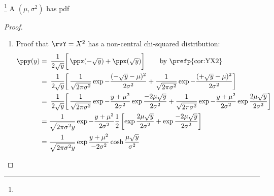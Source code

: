 \begin{definition}
\footnote{
  }
A  $(\mu,\sigma^2)$
has pdf
\end{definition}

\begin{theorem}
\end{theorem}
\begin{proof}
\begin{enumerate}
\item Proof that $\rvY=X^2$ has a non-central chi-squared distribution:
\begin{align*}
  \ppy(y)
    &= \left.\left.\frac{1}{2\sqrt{y}}\right[
       \ppx(-\sqrt{y}) + \ppx( \sqrt{y}) \right]
    \qquad\text{by \prefp{cor:YX2}}
  \\&= \left.\left.\frac{1}{2\sqrt{y}}\right[
       \frac{1}{\sqrt{2\pi\sigma^2}} \exp{-\frac{(-\sqrt{y}-\mu)^2}{2\sigma^2}}+
       \frac{1}{\sqrt{2\pi\sigma^2}} \exp{-\frac{(+\sqrt{y}-\mu)^2}{2\sigma^2}}
       \right]
  \\&= \left.\left.\frac{1}{2\sqrt{y}}\right[
       \frac{1}{\sqrt{2\pi\sigma^2}} \exp{-\frac{y+\mu^2 }{2\sigma^2}} \exp{\frac{-2\mu\sqrt{y}}{2\sigma^2}}+
       \frac{1}{\sqrt{2\pi\sigma^2}} \exp{-\frac{y+\mu^2 }{2\sigma^2}} \exp{\frac{ 2\mu\sqrt{y}}{2\sigma^2}}
       \right]
  \\&= \frac{1}{\sqrt{2\pi\sigma^2y}} \exp{-\frac{y+\mu^2 }{2\sigma^2}}
       \frac{1}{2}
       \left[
         \exp{\frac{ 2\mu\sqrt{y}}{2\sigma^2}} +
         \exp{\frac{-2\mu\sqrt{y}}{2\sigma^2}}
       \right]
  \\&= \frac{1}{\sqrt{2\pi\sigma^2y}} \exp{\frac{y+\mu^2 }{-2\sigma^2}}
         \cosh{\frac{ \mu\sqrt{y}}{\sigma^2}}
\end{align*}
\end{enumerate}
\end{proof}

